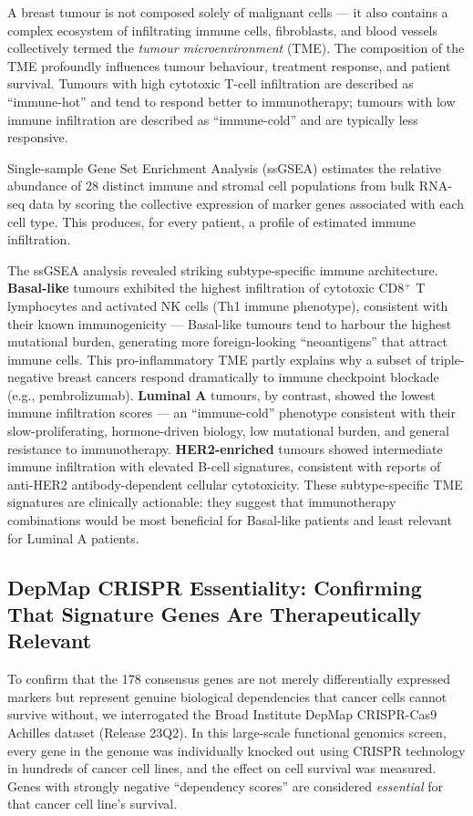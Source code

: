 \documentclass[10pt,a4paper,twocolumn]{article}
\begin{document}
A breast tumour is not composed solely of malignant cells --- it also contains a complex ecosystem of infiltrating immune cells, fibroblasts, and blood vessels collectively termed the \textit{tumour microenvironment} (TME). The composition of the TME profoundly influences tumour behaviour, treatment response, and patient survival. Tumours with high cytotoxic T-cell infiltration are described as ``immune-hot'' and tend to respond better to immunotherapy; tumours with low immune infiltration are described as ``immune-cold'' and are typically less responsive.

Single-sample Gene Set Enrichment Analysis (ssGSEA) estimates the relative abundance of 28 distinct immune and stromal cell populations from bulk RNA-seq data by scoring the collective expression of marker genes associated with each cell type. This produces, for every patient, a profile of estimated immune infiltration.

The ssGSEA analysis revealed striking subtype-specific immune architecture. \textbf{Basal-like} tumours exhibited the highest infiltration of cytotoxic CD8$^+$ T lymphocytes and activated NK cells (Th1 immune phenotype), consistent with their known immunogenicity --- Basal-like tumours tend to harbour the highest mutational burden, generating more foreign-looking ``neoantigens'' that attract immune cells. This pro-inflammatory TME partly explains why a subset of triple-negative breast cancers respond dramatically to immune checkpoint blockade (e.g., pembrolizumab). \textbf{Luminal A} tumours, by contrast, showed the lowest immune infiltration scores --- an ``immune-cold'' phenotype consistent with their slow-proliferating, hormone-driven biology, low mutational burden, and general resistance to immunotherapy. \textbf{HER2-enriched} tumours showed intermediate immune infiltration with elevated B-cell signatures, consistent with reports of anti-HER2 antibody-dependent cellular cytotoxicity. These subtype-specific TME signatures are clinically actionable: they suggest that immunotherapy combinations would be most beneficial for Basal-like patients and least relevant for Luminal A patients.

\subsection{DepMap CRISPR Essentiality: Confirming That Signature Genes Are Therapeutically Relevant}

To confirm that the 178 consensus genes are not merely differentially expressed markers but represent genuine biological dependencies that cancer cells cannot survive without, we interrogated the Broad Institute DepMap CRISPR-Cas9 Achilles dataset (Release 23Q2). In this large-scale functional genomics screen, every gene in the genome was individually knocked out using CRISPR technology in hundreds of cancer cell lines, and the effect on cell survival was measured. Genes with strongly negative ``dependency scores'' are considered \textit{essential} for that cancer cell line's survival.
\end{document}
